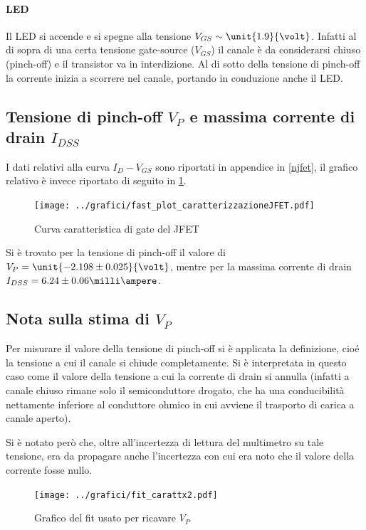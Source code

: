 \documentclass[10pt,a4paper]{article}
\begin{document}
\paragraph{LED} Il LED si accende e si spegne alla tensione $V_{GS} \sim \unit{1.9}{\volt}$. Infatti al di sopra di una certa tensione gate-source ($V_{GS}$) il canale è da considerarsi chiuso (pinch-off) e il transistor va in interdizione. Al di sotto della tensione di pinch-off la corrente inizia a scorrere nel canale, portando in conduzione anche il LED.

\subsection{Tensione di pinch-off $V_P$ e massima corrente di drain $I_{DSS}$}
I dati relativi alla curva $I_D - V_{GS}$ sono riportati in appendice in \tablename{\ref{njfet}}, il grafico relativo è invece riportato di seguito in \figurename{\ref{fig:njfet}}.

\begin{figure}[h!]
	\centering
	\texttt{[image: ../grafici/fast\_plot\_caratterizzazioneJFET.pdf]}
	\caption{Curva caratteristica di gate del JFET}
	\label{fig:njfet}
\end{figure}

Si è trovato per la tensione di pinch-off il valore di $V_P = \unit{-2.198 \pm 0.025}{\volt} $, mentre per la massima corrente di drain $I_{DSS} = {6.24 \pm 0.06 }{\milli\ampere} $.

\subsection{Nota sulla stima di $V_P$}
Per misurare il valore della tensione di pinch-off si è applicata la definizione, cioé la tensione a cui il canale si chiude completamente. Si è interpretata in questo caso come il valore della tensione a cui la corrente di drain si annulla (infatti a canale chiuso rimane solo il semiconduttore drogato, che ha una conducibilità nettamente inferiore al conduttore ohmico in cui avviene il trasporto di carica a canale aperto).

Si è notato però che, oltre all'incertezza di lettura del multimetro su tale tensione, era da propagare anche l'incertezza con cui era noto che il valore della corrente fosse nullo.

\begin{figure}[h!]
	\centering
	\texttt{[image: ../grafici/fit\_carattx2.pdf]}
	\caption{Grafico del fit usato per ricavare $V_P$}
	\label{fig:vpfit}
\end{figure}
\end{document}
